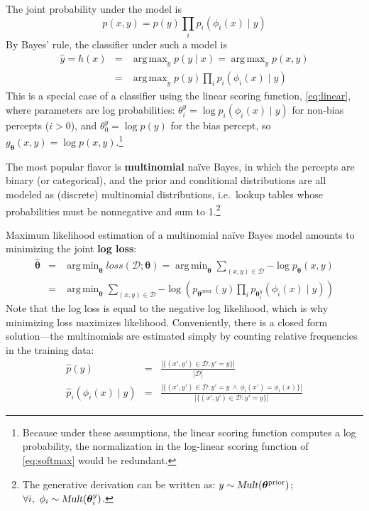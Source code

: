 \documentclass[11pt,letterpaper]{article}
\DeclareMathOperator*{\argmax}{arg\,max}
\DeclareMathOperator*{\argmin}{arg\,min}
\begin{document}
The joint probability under the model is
\begin{equation}
p(x,y) = p(y)\prod_i{p_i(\phi_i(x) \mid y)}
\end{equation}
By Bayes' rule, the classifier under such a model is
\begin{eqnarray}
\hat{y} = h(x) &=& \argmax_y{p(y \mid x)} = \argmax_y{p(x,y)} \\
               &=& \argmax_y{p(y)\prod_i{p_i(\phi_i(x) \mid y)}}
\end{eqnarray}
This is a special case of a classifier using the linear scoring function, \cref{eq:linear}, 
where parameters are log probabilities: $\theta^y_i = \log{p_i(\phi_i(x) \mid y)}$ for non-bias percepts ($i>0$), and 
$\theta^y_0 = \log{p(y)}$ for the bias percept, so $g_{\boldsymbol{\theta}}(x,y)=\log{p(x,y)}$.\footnote{Because under these assumptions, 
the linear scoring function computes a log probability, the normalization in the log-linear scoring function of \cref{eq:softmax} would be redundant.}

The most popular flavor is \textbf{multinomial} na\"{i}ve Bayes, in which the 
percepts are binary (or categorical), and 
the prior and conditional distributions are all modeled as (discrete) multinomial distributions, i.e.~lookup tables 
whose probabilities must be nonnegative and sum to 1.\footnote{The generative derivation can be written as: 
$y \sim \textsl{Mult}(\boldsymbol{\theta}^{\text{prior}})$; $\forall i,~\phi_i \sim \textsl{Mult}(\boldsymbol{\theta}^y_i)$.}

Maximum likelihood estimation of a multinomial na\"{i}ve Bayes model amounts to minimizing the joint \textbf{log loss}:
\begin{eqnarray}
\hat{\boldsymbol{\theta}} &=& \argmin_{\boldsymbol{\theta}} \textit{loss}(\mathcal{D}; \boldsymbol{\theta})
=   \argmin_{\boldsymbol{\theta}}{\sum_{(x,y) \in \mathcal{D}}{-\log{p_{\boldsymbol{\theta}}(x,y)}}} \\
&=& \argmin_{\boldsymbol{\theta}}{\sum_{(x,y) \in \mathcal{D}}{-\log{\left(p_{\boldsymbol{\theta}^{\text{prior}}}(y)\prod_i{p_{\boldsymbol{\theta}^y_i}(\phi_i(x) \mid y)}\right)}}}
\end{eqnarray}
Note that the log loss is equal to the negative log likelihood, which is why minimizing loss maximizes likelihood.
Conveniently, there is a closed form solution---the multinomials are estimated simply by 
counting relative frequencies in the training data:
\begin{eqnarray}
\hat{p}(y) &=& \frac{|\{(x',y')\in\mathcal{D}: y'=y\}|}{|\mathcal{D}|} \\
\hat{p}_i(\phi_i(x) \mid y) &=& \frac{|\{(x',y')\in\mathcal{D}: y'=y~\wedge~\phi_i(x')=\phi_i(x)\}|}{|\{(x',y')\in\mathcal{D}: y'=y\}|}
\end{eqnarray}
\end{document}
